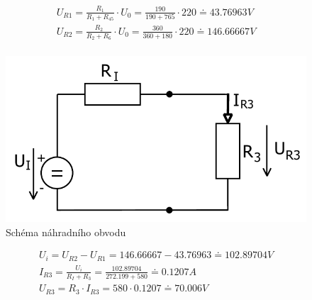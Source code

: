 \begin{gather*}
U_{R1}=\frac{R_1}{R_1+R_{45}}\cdot U_0=\frac{190}{190+765}\cdot 220\doteq43.76963V\\
U_{R2}=\frac{R_2}{R_2+R_6}\cdot U_0=\frac{360}{360+180}\cdot 220\doteq146.66667V\\
\end{gather*}

\begin{figure}[H]
		\center\includegraphics[width=0.6\linewidth]{obr/2_3.pdf}
		\caption{Schéma náhradního obvodu}
	\end{figure}
	
\begin{gather*}
U_i=U_{R2}-U_{R1}=146.66667-43.76963\doteq102.89704V\\
I_{R3}=\frac{U_i}{R_I+R_3}=\frac{102.89704}{272.199+580}\doteq0.1207A\\
U_{R3}=R_3\cdot I_{R3}=580\cdot0.1207\doteq70.006V
\end{gather*}